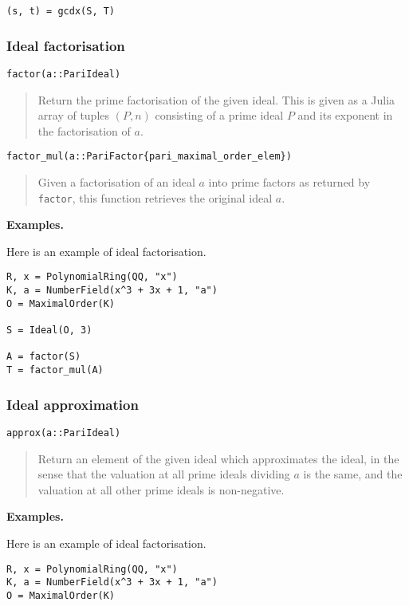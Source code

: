 \documentclass[a4paper,10pt]{article}
\newcommand{\code}{\lstinline}
\newcommand{\desc}[1]{\vspace{-3mm}\begin{quote}#1\end{quote}}
\begin{document}
{{\begin{lstlisting}
(s, t) = gcdx(S, T)
\end{lstlisting}

\subsubsection{Ideal factorisation}

\begin{lstlisting}
factor(a::PariIdeal)
\end{lstlisting}

\desc{Return the prime factorisation of the given ideal. This is given as a Julia
array of tuples $(P, n)$ consisting of a prime ideal $P$ and its exponent in the
factorisation of $a$.}

\begin{lstlisting}
factor_mul(a::PariFactor{pari_maximal_order_elem})
\end{lstlisting}

\desc{Given a factorisation of an ideal $a$ into prime factors as returned by
\code{factor}, this function retrieves the original ideal $a$.}

\textbf{Examples.}

Here is an example of ideal factorisation.

\begin{lstlisting}
R, x = PolynomialRing(QQ, "x")
K, a = NumberField(x^3 + 3x + 1, "a")
O = MaximalOrder(K)

S = Ideal(O, 3)

A = factor(S)
T = factor_mul(A)
\end{lstlisting}

\subsubsection{Ideal approximation}

\begin{lstlisting}
approx(a::PariIdeal)
\end{lstlisting}

\desc{Return an element of the given ideal which approximates the ideal, in the
sense that the valuation at all prime ideals dividing $a$ is the same, and the
valuation at all other prime ideals is non-negative.}

\textbf{Examples.}

Here is an example of ideal factorisation.

\begin{lstlisting}
R, x = PolynomialRing(QQ, "x")
K, a = NumberField(x^3 + 3x + 1, "a")
O = MaximalOrder(K)


\end{lstlisting}}}
\end{document}
